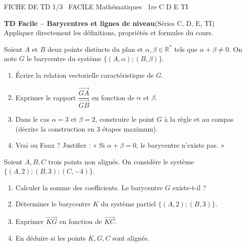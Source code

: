 \documentclass[11pt]{article}
\begin{document}
\begin{tcolorbox}[enhanced,colback=popink,colframe=popink,arc=10pt,boxrule=0pt,left=12pt,right=12pt,top=9pt,bottom=9pt]
{\color{white}\popxbold\small FICHE DE TD 1/3 \textbullet\ FACILE \hfill Mathématiques \textbullet\ 1re C D E TI\par}
\end{tcolorbox}
\vspace{4pt}
\noindent\textbf{TD Facile -- Barycentres et lignes de niveau}\quad (Séries C, D, E, TI)\\
Appliquer directement les définitions, propriétés et formules du cours.

\begin{exercice}
Soient $A$ et $B$ deux points distincts du plan et $\alpha, \beta \in \mathbb{R}^*$ tels que $\alpha+\beta \neq 0$. On note $G$ le barycentre du système $\{(A,\alpha);(B,\beta)\}$.
\begin{enumerate}
    \item Écrire la relation vectorielle caractéristique de $G$.
    \item Exprimer le rapport $\dfrac{\overrightarrow{GA}}{\overrightarrow{GB}}$ en fonction de $\alpha$ et $\beta$.
    \item Dans le cas $\alpha = 3$ et $\beta = 2$, construire le point $G$ à la règle et au compas (décrire la construction en 3 étapes maximum).
    \item Vrai ou Faux ? Justifier : « Si $\alpha+\beta = 0$, le barycentre n'existe pas. »
\end{enumerate}
\end{exercice}

\begin{exercice}
Soient $A, B, C$ trois points non alignés. On considère le système $\{(A,2);(B,3);(C,-4)\}$.
\begin{enumerate}
    \item Calculer la somme des coefficients. Le barycentre $G$ existe-t-il ?
    \item Déterminer le barycentre $K$ du système partiel $\{(A,2);(B,3)\}$.
    \item Exprimer $\overrightarrow{KG}$ en fonction de $\overrightarrow{KC}$.
    \item En déduire si les points $K, G, C$ sont alignés.
\end{enumerate}
\end{exercice}
\end{document}
